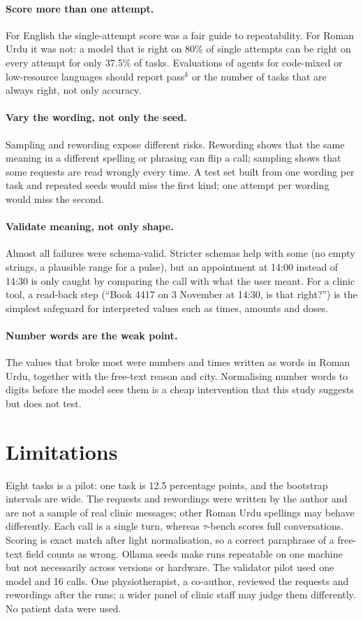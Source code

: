\documentclass[11pt,a4paper]{article}
\newcommand{\passk}[1]{pass$^{#1}$}
\begin{document}
\paragraph{Score more than one attempt.} For English the single-attempt score was a fair guide to repeatability.
For Roman Urdu it was not: a model that is right on 80\% of single attempts can be right on every attempt for only
37.5\% of tasks. Evaluations of agents for code-mixed or low-resource languages should report \passk{k} or the
number of tasks that are always right, not only accuracy.

\paragraph{Vary the wording, not only the seed.} Sampling and rewording expose different risks. Rewording shows
that the same meaning in a different spelling or phrasing can flip a call; sampling shows that some requests are
read wrongly every time. A test set built from one wording per task and repeated seeds would miss the first kind;
one attempt per wording would miss the second.

\paragraph{Validate meaning, not only shape.} Almost all failures were schema-valid. Stricter schemas help with
some (no empty strings, a plausible range for a pulse), but an appointment at 14:00 instead of 14:30 is only caught by
comparing the call with what the user meant. For a clinic tool, a read-back step (``Book 4417 on 3 November at
14:30, is that right?'') is the simplest safeguard for interpreted values such as times, amounts and doses.

\paragraph{Number words are the weak point.} The values that broke most were numbers and times written as words in
Roman Urdu, together with the free-text reason and city. Normalising number words to digits before the model sees
them is a cheap intervention that this study suggests but does not test.

\section{Limitations}

Eight tasks is a pilot: one task is 12.5 percentage points, and the bootstrap intervals are wide. The requests and
rewordings were written by the author and are not a sample of real clinic messages; other Roman Urdu spellings may
behave differently. Each call is a single turn, whereas $\tau$-bench scores full conversations. Scoring is exact match
after light normalisation, so a correct paraphrase of a free-text field counts as wrong. Ollama seeds make runs
repeatable on one machine but not necessarily across versions or hardware. The validator pilot used one model and
16 calls. One physiotherapist, a co-author, reviewed the requests and rewordings after the runs; a wider panel of clinic staff may judge them differently. No patient data were used.
\end{document}
